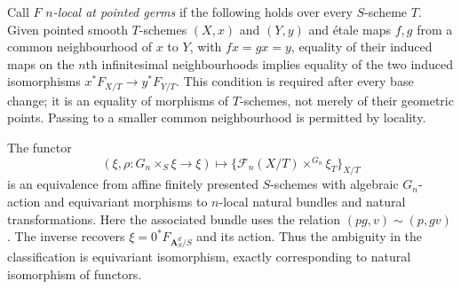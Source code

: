 Call $F$ \emph{$n$-local at pointed germs} if the following holds over every
$S$-scheme $T$. Given pointed smooth $T$-schemes $(X,x)$ and $(Y,y)$ and
\'{e}tale maps $f,g$ from a common neighbourhood of $x$ to $Y$, with
$f x=g x=y$, equality of their induced maps on the $n$th infinitesimal
neighbourhoods implies equality of the two induced isomorphisms
$x^*F_{X/T}\to y^*F_{Y/T}$. This condition is required after every base
change; it is an equality of morphisms of $T$-schemes, not merely of their
geometric points. Passing to a smaller common neighbourhood is permitted
by locality.

\begin{theorem}
\label{geo-F-fixed}
The functor
\[
 (\xi,\rho:G_n\times_S\xi\to\xi)
 \longmapsto
 \bigl\{\mathcal F_n(X/T)\mathbin{\times^{G_n}}\xi_T\bigr\}_{X/T}
\]
is an equivalence from affine finitely presented $S$-schemes with algebraic
$G_n$-action and equivariant morphisms to $n$-local natural bundles and
natural transformations. Here the associated bundle uses the relation
$(p g,v)\sim(p,g v)$. The inverse recovers
$\xi=0^*F_{\mathbf A^d_S/S}$ and its action. Thus the ambiguity in the
classification is equivariant isomorphism, exactly corresponding to natural
isomorphism of functors.
\end{theorem}
